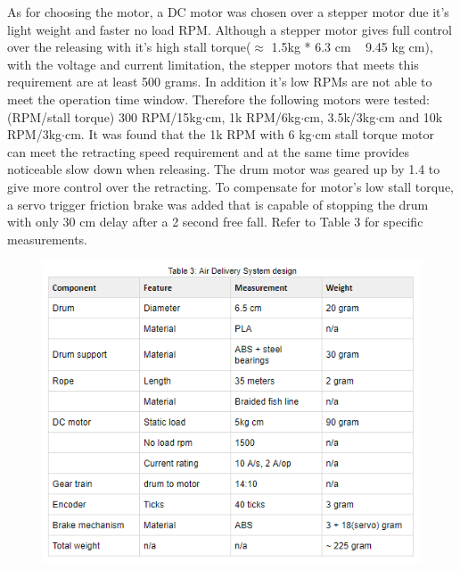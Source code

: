 As for choosing the motor, a DC motor was chosen over a stepper motor due it’s light weight and faster no load RPM. Although a stepper motor gives full control over the releasing with it’s high stall torque($\approx$ 1.5kg * 6.3 cm ~ 9.45 kg cm), with the voltage and current limitation, the stepper motors that meets this requirement are at least 500 grams. In addition it's low RPMs are not able to meet the operation time window. Therefore the following motors were tested: (RPM/stall torque) 300 RPM/15kg$\cdot$cm, 1k RPM/6kg$\cdot$cm, 3.5k/3kg$\cdot$cm and 10k RPM/3kg$\cdot$cm. It was found that the 1k RPM with 6 kg$\cdot$cm stall torque motor can meet the retracting speed requirement and at the same time provides noticeable slow down when releasing. The drum motor was geared up by 1.4 to give more control over the retracting. To compensate for motor’s low stall torque, a servo trigger friction brake was added that is capable of stopping the drum with only 30 cm delay after a 2 second free fall.
Refer to Table 3 for specific measurements. 

\begin{figure}[h]\centering
\includegraphics[width=\linewidth]{table/Table_3_Air_delivery_system_design.PNG}
\caption*{}
\label{fig:airdrop_design}
\end{figure}



